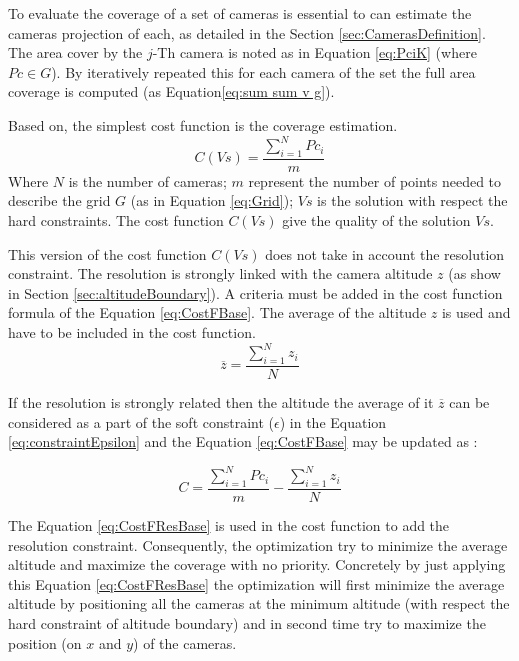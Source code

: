 To evaluate the coverage of a set of cameras is essential to can estimate the cameras projection of each, as detailed in the Section \ref{sec:CamerasDefinition}. The area cover by the $j$-Th camera is noted as in Equation \ref{eq:PciK} (where $Pc\in G$). By iteratively repeated this for each camera of the set the full area coverage is computed (as Equation\ref{eq:sum sum v g}). 

Based on, the simplest cost function is the coverage estimation.
\begin{equation}\label{eq:CostFBase}
C(Vs) =  \frac{\sum_{i=1}^N{Pc_i} }{m}   
\end{equation}
Where $N$ is the number of cameras; 
$m$ represent the number of points needed to describe the grid $G$ (as in Equation \ref{eq:Grid}); $Vs$ is the solution with respect the hard constraints.
The cost function $C(Vs)$ give the quality of the solution $Vs$.

This version of the cost function $C(Vs)$ does not take in account the resolution constraint. The resolution is  strongly linked with the camera altitude $z$ (as show in Section \ref{sec:altitudeBoundary}).
 A criteria must be added in the cost function formula of the Equation \ref{eq:CostFBase}. The average of the altitude $z$ is used and have to be included in the cost function.
 \begin{equation}\label{eq:CostFResolutionPart1}
\overline{z}= \frac{\sum_{i=1}^N z_i}{N}     
\end{equation}

 If the resolution is strongly related then the altitude the average of it $\overline{z}$ can be considered as a part of the soft constraint ($\epsilon$)  in the Equation \ref{eq:constraintEpsilon} and the Equation \ref{eq:CostFBase} may be updated as : 
 
 \begin{equation}\label{eq:CostFResBase}
C =  \frac{\sum_{i=1}^N {Pc_i}}{m}  - \frac{\sum_{i=1}^N z_i}{N}     
\end{equation}
 
The Equation \ref{eq:CostFResBase} is used in the cost function to add the resolution constraint. Consequently, the optimization  try to minimize the average altitude and maximize the coverage with no priority. Concretely by just applying this Equation  \ref{eq:CostFResBase} the optimization will first minimize the average altitude by positioning all the cameras at the minimum altitude (with respect the hard constraint of altitude boundary) and in second time try to maximize the position (on $x$ and $y$) of the cameras. 

